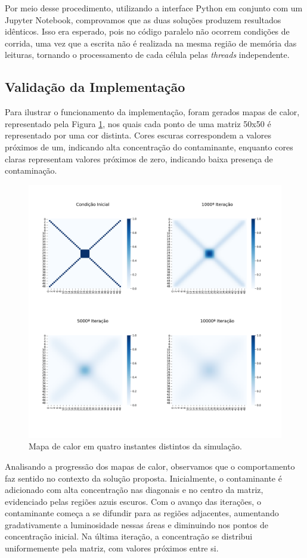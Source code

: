 \documentclass[12pt]{article}
\begin{document}
Por meio desse procedimento, utilizando a interface Python em conjunto com um
Jupyter Notebook, comprovamos que as duas soluções produzem resultados
idênticos. Isso era esperado, pois no código paralelo não ocorrem condições de
corrida, uma vez que a escrita não é realizada na mesma região de memória das
leituras, tornando o processamento de cada célula pelas \textit{threads}
independente.

\subsection{Validação da Implementação}

Para ilustrar o funcionamento da implementação, foram gerados mapas de calor,
representado pela Figura \ref{fig:heatmap}, nos quais cada ponto de uma matriz
50x50 é representado por uma cor distinta. Cores escuras correspondem a valores
próximos de um, indicando alta concentração do contaminante, enquanto cores
claras representam valores próximos de zero, indicando baixa presença de
contaminação.

\begin{figure}[ht]
  \centering
  \includegraphics[width=.6\textwidth]{figs/heatmap.png}
  \caption{Mapa de calor em quatro instantes distintos da simulação.}
  \label{fig:heatmap}
\end{figure}

Analisando a progressão dos mapas de calor, observamos que o comportamento faz
sentido no contexto da solução proposta. Inicialmente, o contaminante é
adicionado com alta concentração nas diagonais e no centro da matriz,
evidenciado pelas regiões azuis escuros. Com o avanço das iterações, o
contaminante começa a se difundir para as regiões adjacentes, aumentando
gradativamente a luminosidade nessas áreas e diminuindo nos pontos de
concentração inicial. Na última iteração, a concentração se distribui
uniformemente pela matriz, com valores próximos entre si.
\end{document}
